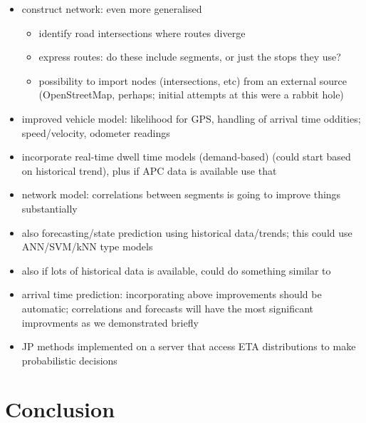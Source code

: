\begin{itemize}
\begin{itemize}
  \item construct network: even more generalised
  \begin{itemize}
    \item identify road intersections where routes diverge
    \item express routes: do these include segments, or just the stops they use?
    \item possibility to import nodes (intersections, etc) from an external source (OpenStreetMap, perhaps; initial attempts at this were a rabbit hole)
  \end{itemize}
  \item improved vehicle model: likelihood for GPS, handling of arrival time oddities; speed/velocity, odometer readings
  \item incorporate real-time dwell time models (demand-based) (could start based on historical trend), plus if APC data is available use that
  \item network model: correlations between segments is going to improve things substantially
  \item also forecasting/state prediction using historical data/trends; this could use ANN/SVM/kNN type models
  \item also if lots of historical data is available, could do something similar to \cite{Chen_2014}
  \item arrival time prediction: incorporating above improvements should be automatic; correlations and forecasts will have the most significant improvments as we demonstrated briefly
  \item JP methods implemented on a server that access ETA distributions to make probabilistic decisions
\end{itemize}


\section{Conclusion}


\end{itemize}
